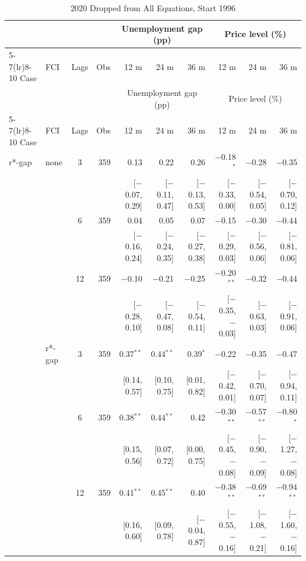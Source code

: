 \begingroup\scriptsize\setlength{\tabcolsep}{0.9pt}
\begin{longtable}{llcrrrrrrr}
\caption{2020 Dropped from All Equations, Start 1996}\label{tab:appR1b}\\
\toprule
 & & & & \multicolumn{3}{c}{Unemployment gap (pp)} & \multicolumn{3}{c}{Price level (\%)}\\ \cmidrule(lr){5-7}\cmidrule(lr){8-10}
Case & FCI & Lags & Obs & 12 m & 24 m & 36 m & 12 m & 24 m & 36 m\\
\midrule\endfirsthead
\toprule
 & & & & \multicolumn{3}{c}{Unemployment gap (pp)} & \multicolumn{3}{c}{Price level (\%)}\\ \cmidrule(lr){5-7}\cmidrule(lr){8-10}
Case & FCI & Lags & Obs & 12 m & 24 m & 36 m & 12 m & 24 m & 36 m\\
\midrule\endhead
\bottomrule\endfoot
r*-gap & none & 3 & 359 & 0.13 & 0.22 & 0.26 & $-$0.18$^{*}$ & $-$0.28 & $-$0.35\\
 & & & & {\scriptsize [$-$0.07, 0.29]} & {\scriptsize [$-$0.11, 0.47]} & {\scriptsize [$-$0.13, 0.53]} & {\scriptsize [$-$0.33, 0.00]} & {\scriptsize [$-$0.54, 0.05]} & {\scriptsize [$-$0.70, 0.12]}\\
 &  & 6 & 359 & 0.04 & 0.05 & 0.07 & $-$0.15 & $-$0.30 & $-$0.44\\
 & & & & {\scriptsize [$-$0.16, 0.24]} & {\scriptsize [$-$0.24, 0.35]} & {\scriptsize [$-$0.27, 0.38]} & {\scriptsize [$-$0.29, 0.03]} & {\scriptsize [$-$0.56, 0.06]} & {\scriptsize [$-$0.81, 0.06]}\\
 &  & 12 & 359 & $-$0.10 & $-$0.21 & $-$0.25 & $-$0.20$^{**}$ & $-$0.32 & $-$0.44\\
 & & & & {\scriptsize [$-$0.28, 0.10]} & {\scriptsize [$-$0.47, 0.08]} & {\scriptsize [$-$0.54, 0.11]} & {\scriptsize [$-$0.35, $-$0.03]} & {\scriptsize [$-$0.63, 0.03]} & {\scriptsize [$-$0.91, 0.06]}\\
 & r*-gap & 3 & 359 & 0.37$^{**}$ & 0.44$^{**}$ & 0.39$^{*}$ & $-$0.22 & $-$0.35 & $-$0.47\\
 & & & & {\scriptsize [0.14, 0.57]} & {\scriptsize [0.10, 0.75]} & {\scriptsize [0.01, 0.82]} & {\scriptsize [$-$0.42, 0.01]} & {\scriptsize [$-$0.70, 0.07]} & {\scriptsize [$-$0.94, 0.11]}\\
 &  & 6 & 359 & 0.38$^{**}$ & 0.44$^{**}$ & 0.42 & $-$0.30$^{**}$ & $-$0.57$^{**}$ & $-$0.80$^{*}$\\
 & & & & {\scriptsize [0.15, 0.56]} & {\scriptsize [0.07, 0.72]} & {\scriptsize [0.00, 0.75]} & {\scriptsize [$-$0.45, $-$0.08]} & {\scriptsize [$-$0.90, $-$0.09]} & {\scriptsize [$-$1.27, $-$0.08]}\\
 &  & 12 & 359 & 0.41$^{**}$ & 0.45$^{**}$ & 0.40 & $-$0.38$^{**}$ & $-$0.69$^{**}$ & $-$0.94$^{**}$\\
 & & & & {\scriptsize [0.16, 0.60]} & {\scriptsize [0.09, 0.78]} & {\scriptsize [$-$0.04, 0.87]} & {\scriptsize [$-$0.55, $-$0.16]} & {\scriptsize [$-$1.08, $-$0.21]} & {\scriptsize [$-$1.60, $-$0.16]}\\
\end{longtable}
